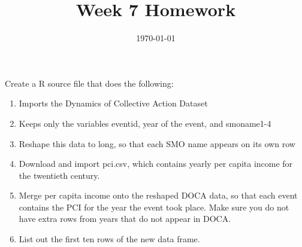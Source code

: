 \documentclass[12pt, oneside]{article}   	%
\title{Week 7 Homework}
\date{\today}							%
\begin{document}
\maketitle

Create a R source file that does the following:

\begin{enumerate}
\item Imports the Dynamics of Collective Action Dataset
\item Keeps only the variables eventid, year of the event, and smoname1-4
\item Reshape this data to long, so that each SMO name appears on its own row
\item Download and import pci.csv, which contains yearly per capita income for the twentieth century.
\item Merge per capita income onto the reshaped DOCA data, so that each event contains the PCI for the year the event took place. Make sure you do not have extra rows from years that do not appear in DOCA.
\item List out the first ten rows of the new data frame.
\end{enumerate}
\end{document}
